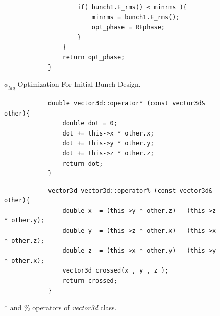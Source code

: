 \documentclass[a4paper,oneside,12pt]{report}
\numberwithin{equation}{chapter}
\begin{document}
{\begin{figure}[H]
\begin{verbatim}
                    if( bunch1.E_rms() < minrms ){
                        minrms = bunch1.E_rms();
                        opt_phase = RFphase;
                    }
                }
                return opt_phase;
            }
        \end{verbatim}
    \vspace{20pt}
    \caption{$\phi_{lag}$ Optimization For Initial Bunch Design.}
    \label{fig:phlag_opt_n_pass}
\end{figure}
\vspace{20pt}
\begin{figure}[H]
    \begin{minipage}{\textwidth}
        \begin{verbatim}
            double vector3d::operator* (const vector3d& other){
                double dot = 0;
                dot += this->x * other.x;
                dot += this->y * other.y;
                dot += this->z * other.z;
                return dot;
            }
        \end{verbatim}
    \end{minipage}
    \vspace{10pt}
    \begin{minipage}{\textwidth}
        \begin{verbatim}
            vector3d vector3d::operator% (const vector3d& other){
                double x_ = (this->y * other.z) - (this->z * other.y);
                double y_ = (this->z * other.x) - (this->x * other.z);
                double z_ = (this->x * other.y) - (this->y * other.x);
                vector3d crossed(x_, y_, z_);
                return crossed;
            }
        \end{verbatim}
    \end{minipage}
    \vspace{20pt}
    \caption{* and \% operators of \textit{vector3d} class.}
    \label{fig:vector3d_dot_cross_product}
\end{figure}


}
\end{document}
